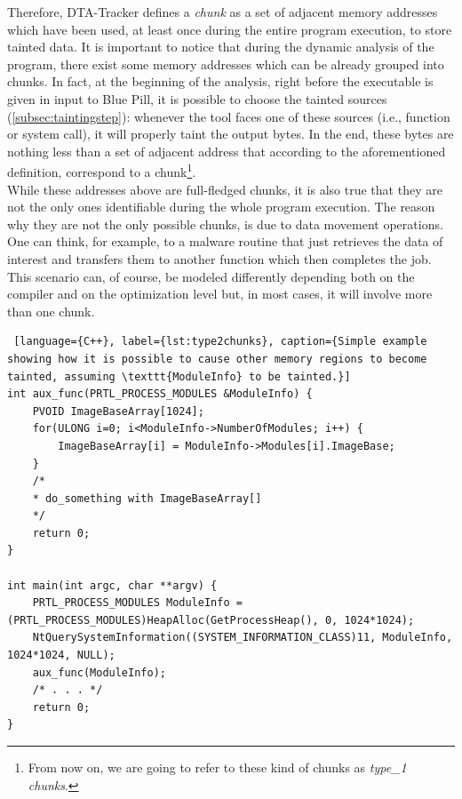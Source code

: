 \documentclass[LaM,binding=0.6cm]{sapthesis}
\begin{document}
Therefore, DTA-Tracker defines a \textit{chunk} as a set of adjacent memory addresses which have been used, at least once during the entire program execution, to store tainted data. It is important to notice that during the dynamic analysis of the program, there exist some memory addresses which can be already grouped into chunks. In fact, at the beginning of the analysis, right before the executable is given in input to Blue Pill, it is possible to choose the tainted sources (\autoref{subsec:taintingstep}): whenever the tool faces one of these sources (i.e., function or system call), it will properly taint the output bytes. In the end, these bytes are nothing less than a set of adjacent address that according to the aforementioned definition, correspond to a chunk\footnote{From now on, we are going to refer to these kind of chunks as \textit{type\_1 chunks}.}.\\
While these addresses above are full-fledged chunks, it is also true that they are not the only ones identifiable during the whole program execution. The reason why they are not the only possible chunks, is due to data movement operations. One can think, for example, to a malware routine that just retrieves the data of interest and transfers them to another function which then completes the job. This scenario can, of course, be modeled differently depending both on the compiler and on the optimization level but, in most cases, it will involve more than one chunk.
\newpage
\begin{lstlisting} [language={C++}, label={lst:type2chunks}, caption={Simple example showing how it is possible to cause other memory regions to become tainted, assuming \texttt{ModuleInfo} to be tainted.}]
int aux_func(PRTL_PROCESS_MODULES &ModuleInfo) {
	PVOID ImageBaseArray[1024];
	for(ULONG i=0; i<ModuleInfo->NumberOfModules; i++) {
		ImageBaseArray[i] = ModuleInfo->Modules[i].ImageBase;
	}
	/*
	* do_something with ImageBaseArray[]
	*/
	return 0;
}

int main(int argc, char **argv) {
	PRTL_PROCESS_MODULES ModuleInfo = (PRTL_PROCESS_MODULES)HeapAlloc(GetProcessHeap(), 0, 1024*1024);
	NtQuerySystemInformation((SYSTEM_INFORMATION_CLASS)11, ModuleInfo, 1024*1024, NULL);
	aux_func(ModuleInfo);
	/* . . . */
	return 0;
}

\end{lstlisting}
\end{document}
